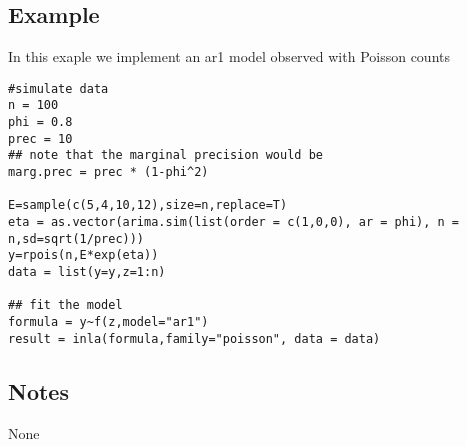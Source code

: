\documentclass[a4paper,11pt]{article}
\begin{document}
\subsection*{Example}

In this exaple we implement an ar1 model observed with Poisson counts
\begin{verbatim}
#simulate data
n = 100
phi = 0.8
prec = 10
## note that the marginal precision would be
marg.prec = prec * (1-phi^2)

E=sample(c(5,4,10,12),size=n,replace=T)
eta = as.vector(arima.sim(list(order = c(1,0,0), ar = phi), n = n,sd=sqrt(1/prec)))
y=rpois(n,E*exp(eta))
data = list(y=y,z=1:n)

## fit the model
formula = y~f(z,model="ar1")
result = inla(formula,family="poisson", data = data)
\end{verbatim}


\subsection*{Notes}

None
\end{document}
